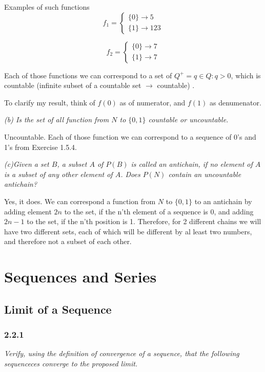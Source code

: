 \documentclass[11pt,oneside,titlepage]{book}
\begin{document}
Examples of such functions
\begin{equation}
  f_1 =
  \begin{cases}
    \{0\} \to 5 \\
    \{1\} \to 123
  \end{cases}
\end{equation}

\begin{equation}
  f_2 =
  \begin{cases}
    \{0\} \to 7 \\
    \{1\} \to 7
  \end{cases}
\end{equation}

Each of those functions we can correspond to a set of $Q^+ = {q \in Q: q > 0}$,
which is countable (infinite subset of a countable set $\to$ countable) .

To clarify my result, think of $f(0)$ as of numerator, and $f(1)$ as denumenator.

\textit{(b) Is the set of all function from $N$ to $\{0, 1\}$ countable or uncountable.}

Uncountable. Each of those function we can correspond to a sequence of 0's and 1's from
Exercise 1.5.4.

\textit{(c)Given a set $B$, a subset $A$ of $P(B)$ is called an antichain, if no
  element of $A$ is a subset of any other element of $A$. Does $P(N)$ contain an
  uncountable antichain?}

Yes, it does. We can correspond a function from $N$ to $\{0, 1\}$ to an antichain
by adding element $2n$ to the set, if the n'th element of a sequence is 0, and
adding $2n - 1$ to the set, if the n'th position is 1. Therefore, for
2 different chains we will have two different sets, each of which will be
different by al least two numbers, and therefore not a subset of each other.

\chapter{Sequences and Series}

\section{Limit of a Sequence}

\subsection*{2.2.1}
\textit{Verify, using the definition of convergence of a sequence, that the following
  sequenceces converge to the proposed limit.}
\end{document}

